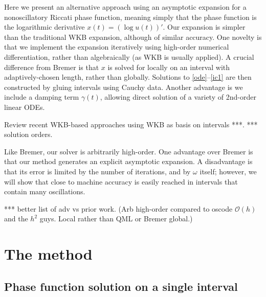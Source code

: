 \documentclass[10pt]{article}
\newcommand{\bigO}{{\mathcal O}}
\begin{document}
Here we present an alternative approach using
an asymptotic expansion for a nonoscillatory
Riccati phase function, meaning simply that the
phase function is the logarithmic derivative $x(t) = (\log u(t))'$.
Our expansion is simpler than the traditional WKB expansion,
although of similar accuracy.
One novelty is that we
implement the expansion iteratively
using high-order numerical differentiation, rather
than algebraically (as WKB is usually applied).
A crucial difference from Bremer is that $x$ is solved for
locally on an interval with adaptively-chosen length, rather than
globally.
Solutions to \eqref{ode}--\eqref{ic1} are then constructed by
gluing intervals using Cauchy data.
Another advantage is we include a damping term $\gamma(t)$,
allowing direct
solution of a variety of 2nd-order linear ODEs.

Review recent WKB-based approaches using WKB as basis on intervals ***.
*** solution orders.


Like Bremer, our solver is arbitrarily high-order.
One advantage over Bremer is that our method generates an explicit asymptotic
expansion. A disadvantage is that its error is limited by the number
of iterations, and by $\omega$ itself; however,
we will show that close to machine accuracy is easily reached in
intervals that contain many oscillations.

*** better list of adv vs prior work.
(Arb high-order compared to oscode $\bigO(h)$ and the $h^2$ guys.
Local rather than QML or Bremer global.)



\section{The method}

\subsection{Phase function solution on a single interval}
\end{document}
